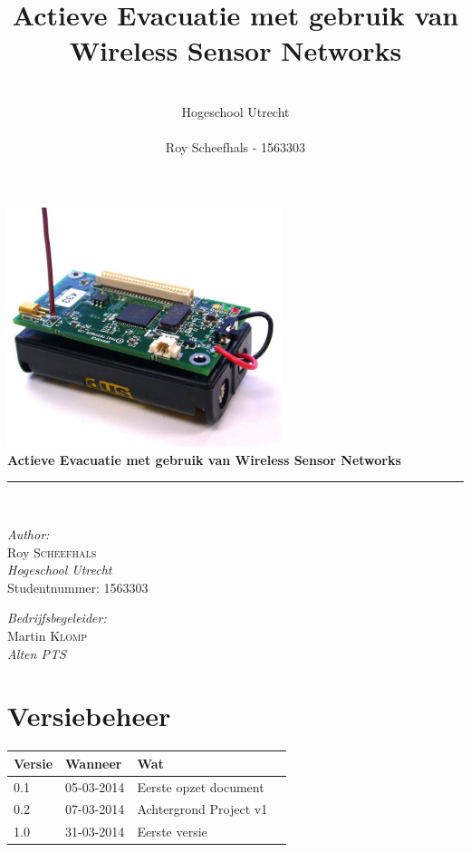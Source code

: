 \documentclass{../local}
\title{\textbf{Actieve Evacuatie met gebruik van Wireless Sensor Networks}}
\author{\\
		Hogeschool Utrecht\\
		\\
		Roy Scheefhals - 1563303}
\begin{document}
\begin{titlepage}
\begin{center}

\includegraphics[width=0.6\textwidth]{mica2}~\\[1cm]

{ \huge \bfseries Actieve Evacuatie met gebruik van Wireless Sensor Networks \\[0.4cm] }
\hrule
\hspace{0pt} \\[1.3cm]

\begin{minipage}{0.4\textwidth}
\begin{flushleft} \large
\emph{Author:}\\
Roy \textsc{Scheefhals}\\
\emph{Hogeschool Utrecht}\\
Studentnummer: 1563303\\
\end{flushleft}
\end{minipage}
\begin{minipage}{0.4\textwidth}
\begin{flushright} \large
\emph{Bedrijfsbegeleider:} \\
Martin \textsc{Klomp}\\
\emph{Alten PTS}
\end{flushright}
\end{minipage}

\end{center}
\end{titlepage}

\newpage

\renewcommand{\thesection}{\Roman{section}}

\section*{Versiebeheer}
\begin{tabular}{ | l | l | l | p{7.5cm} |}
\hline
Versie & Wanneer & Wat \\ \hline
0.1 & 05-03-2014 & Eerste opzet document\\ \hline
0.2 & 07-03-2014 & Achtergrond Project v1\\ \hline
1.0 & 31-03-2014 & Eerste versie\\ \hline

\end{tabular}
\end{document}
